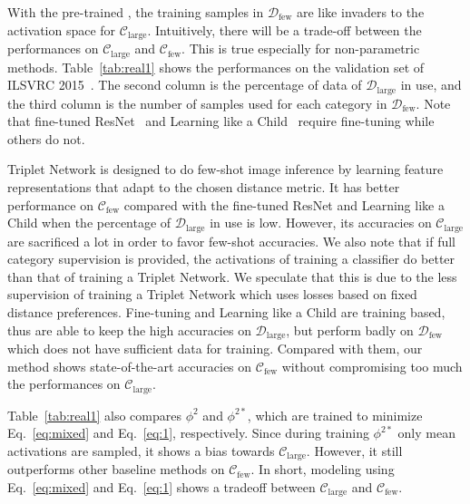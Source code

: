 With the pre-trained , the training samples in $\mathcal{D}_{\text{few}}$ are like invaders to the activation space for  $\mathcal{C}_{\text{large}}$.
Intuitively, there will be a trade-off between the performances on $\mathcal{C}_{\text{large}}$ and $\mathcal{C}_{\text{few}}$. This is true especially for non-parametric methods. Table~\ref{tab:real1} shows the performances on the validation set of ILSVRC 2015~\cite{ILSVRC15}. The second column is the percentage of data of $\mathcal{D}_{\text{large}}$ in use, and the third column is the number of samples used for each category in $\mathcal{D}_{\text{few}}$.
Note that fine-tuned ResNet~\cite{DBLP:conf/cvpr/HeZRS16} and Learning like a Child~\cite{mao2015learning} require fine-tuning while others do not.

Triplet Network is designed to do few-shot image inference by learning feature representations that adapt to the chosen distance metric. It has better performance on $\mathcal{C}_{\text{few}}$ compared with the fine-tuned ResNet and Learning like a Child when the percentage of $\mathcal{D}_{\text{large}}$ in use is low. However, its accuracies on $\mathcal{C}_{\text{large}}$ are sacrificed a lot in order to favor few-shot accuracies. We also note that if full category  supervision is provided, the activations of training a classifier do better than that of training a Triplet Network. We speculate that this is due to the less supervision of training a Triplet Network which uses losses based on fixed distance preferences.
Fine-tuning and Learning like a Child are training based, thus are able to keep the high accuracies on $\mathcal{D}_{\text{large}}$, but perform badly on $\mathcal{D}_{\text{few}}$ which does not have sufficient data for training.
Compared with them, our method shows state-of-the-art accuracies on $\mathcal{C}_{\text{few}}$ without compromising too much the performances on $\mathcal{C}_{\text{large}}$.

Table~\ref{tab:real1} also compares $\phi^2$ and $\phi^{2*}$, which are trained to minimize Eq.~\ref{eq:mixed} and Eq.~\ref{eq:1}, respectively. Since during training $\phi^{2*}$ only mean activations are sampled, it shows a bias towards $\mathcal{C}_{\text{large}}$. However, it still outperforms other baseline methods on $\mathcal{C}_{\text{few}}$.
In short, modeling using Eq.~\ref{eq:mixed} and Eq.~\ref{eq:1} shows a tradeoff between $\mathcal{C}_{\text{large}}$ and $\mathcal{C}_{\text{few}}$.



